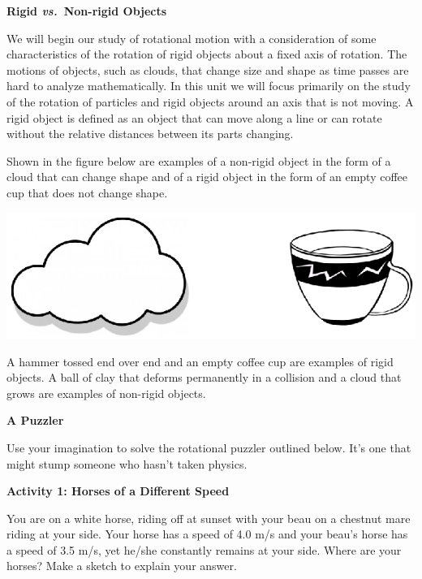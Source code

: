 \textbf{Rigid \textit{vs.}~Non-rigid Objects} 

We will begin our study of rotational motion with a consideration of some characteristics
of the rotation of rigid objects about a fixed axis of rotation. The motions
of objects, such as clouds, that change size and shape as time passes are hard
to analyze mathematically. In this unit we will focus primarily on the study
of the rotation of particles and rigid objects around an axis that is not moving.
A rigid object is defined as an object that can move along a line or can rotate
without the relative distances between its parts changing. 

Shown in the figure below are examples of a non-rigid object in the form of
a cloud that can change shape and of a rigid object in the form of an empty
coffee cup that does not change shape.

\vspace{0.3cm}
{\par\centering \includegraphics{rotation/cloud_and_cup.eps} \par}
\vspace{0.3cm}

A hammer tossed end over end and an empty coffee cup are examples of rigid objects.
A ball of clay that deforms permanently in a collision and a cloud that grows
are examples of non-rigid objects. 
\vspace{0.3cm}

\textbf{A Puzzler} 

Use your imagination to solve the rotational puzzler outlined below. It's one
that might stump someone who hasn't taken physics.

\textbf{Activity 1: Horses of a Different Speed }

You are on a white horse, riding off at sunset with your beau on a chestnut
mare riding at your side. Your horse has a speed of 4.0 m/s and your beau's
horse has a speed of 3.5 m/s, yet he/she constantly remains at your side. Where
are your horses? Make a sketch to explain your answer.

